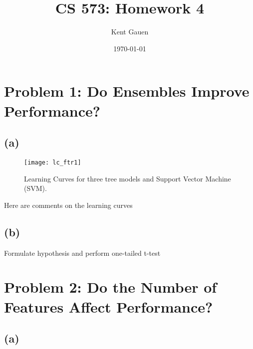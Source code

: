 \documentclass[11pt]{article}
\title{CS 573: Homework 4}
\author{Kent Gauen}
\date{\today}
\begin{document}
\maketitle


\section*{Problem 1: Do Ensembles Improve Performance?}

\subsection*{(a)}

\begin{minipage}{0.5\textwidth}
\begin{figure}[H]
  \centering
  \texttt{[image: lc\_ftr1]}
  \caption{Learning Curves for three tree models and Support Vector Machine (SVM).}
\end{figure}
\end{minipage}%
\hspace{5mm}
\begin{minipage}{0.5\textwidth}
  Here are comments on the learning curves
\end{minipage}

\subsection*{(b)}

Formulate hypothesis and perform one-tailed t-test

\section*{Problem 2: Do the Number of Features Affect Performance?}

\subsection*{(a)}
\end{document}
